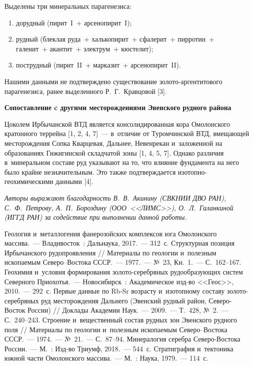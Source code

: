 Выделены три минеральных парагенезиса:
\begin{enumerate}[noitemsep]\vspace{-8pt}
  \item дорудный (пирит~I~+ арсенопирит~I);
  \item рудный (блеклая руда~+ халькопирит~+ сфалерит~+ пирротин~+\\галенит~+ акантит~+ электрум~+ кюстелит);
  \item пострудный (пирит~II~+ марказит~+ арсенопирит~II).
\end{enumerate}
 \vspace{-8pt}Нашими данными не подтверждено существование золото-аргентитового парагенезиса, ранее выделенного Р.~Г.~Кравцовой [3].


\textbf{Сопоставление c другими месторождениями Эвенского рудного района}

Цоколем Ирбычанской ВТД является консолидированная кора Омолонского кратонного террейна [1, 2, 4, 7]~--- в~отличие от Туромчинской ВТД, вмещающей месторождения Сопка Кварцевая, Дальнее, Невенрекан и~заложенной на образованиях Гижигинской складчатой зоны [1, 4, 5, 7]. Однако различия в~минеральном составе руд указывают на то, что влияние фундамента на него было крайне незначительным. Это также подтверждается изотопно-геохимическими данными [4].

\textit{Авторы выражают благодарность В.~В.~Акинину (СВКНИИ ДВО РАН), С.~Ф.~Петрову, А.~П.~Бороздину (ООО~<<ЛИМС>>), О.~Л.~Галанкиной (ИГГД РАН) за содействие при выполнении данной работы.}


\begin{thebibliography}{99}

\bibitem{}
 Геология и~металлогения фанерозойских комплексов юга Омолонского массива.~--- Владивосток~: Дальнаука, 2017.~--- 312~с.
\bibitem{}
 Структурная позиция Ирбычанского рудопроявления // Материалы по геологии и~полезным ископаемым Северо–Востока СССР.~--- 1977.~--- №~23, Кн.~1.~--- С.~162--167.
\bibitem{}
 Геохимия и~условия формирования золото-серебряных рудообразующих систем Северного Приохотья.~--- Новосибирск~: Академическое изд-во <<Геос>>, 2010.~--- 292~с.
\bibitem{}
 Первые данные по Rb-Sr возрасту и~изотопному составу золото-серебряных руд месторождения Дальнего (Эвенский рудный район, Северо-Восток России) // Доклады Академии Наук.~--- 2009.~--- Т.~428, №~2.~--- С.~240--243.
\bibitem{}
 Строение и~вещественный состав рудных зон Эвенского рудного поля // Материалы по геологии и~полезным ископаемым Северо–Востока СССР.~--- 1974.~--- №~21.~--- С.~87--94.
\bibitem{}
 Минералогия серебра Северо-Востока России.~--- М.~: Изд-во Триумф, 2018.~--- 544~с.
\bibitem{}
 Стратиграфия и~тектоника южной части Омолонского массива.~--- М.~: Наука, 1979.~--- 114~с.

\end{thebibliography}
